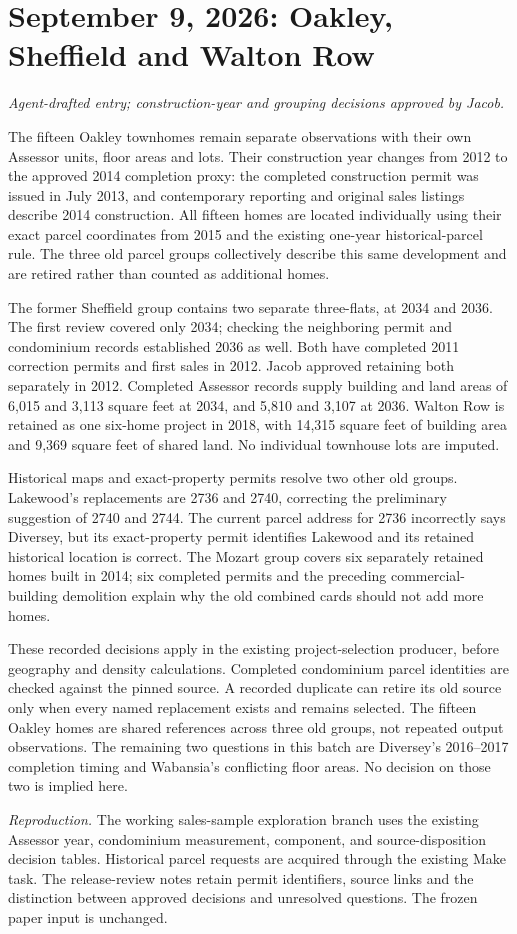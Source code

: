 \clearpage
\section*{September 9, 2026: Oakley, Sheffield and Walton Row}
\textit{Agent-drafted entry; construction-year and grouping decisions approved by Jacob.}

The fifteen Oakley townhomes remain separate observations with their own Assessor units, floor areas and lots. Their construction year changes from 2012 to the approved 2014 completion proxy: the completed construction permit was issued in July 2013, and contemporary reporting and original sales listings describe 2014 construction. All fifteen homes are located individually using their exact parcel coordinates from 2015 and the existing one-year historical-parcel rule. The three old parcel groups collectively describe this same development and are retired rather than counted as additional homes.

The former Sheffield group contains two separate three-flats, at 2034 and 2036. The first review covered only 2034; checking the neighboring permit and condominium records established 2036 as well. Both have completed 2011 correction permits and first sales in 2012. Jacob approved retaining both separately in 2012. Completed Assessor records supply building and land areas of 6,015 and 3,113 square feet at 2034, and 5,810 and 3,107 at 2036. Walton Row is retained as one six-home project in 2018, with 14,315 square feet of building area and 9,369 square feet of shared land. No individual townhouse lots are imputed.

Historical maps and exact-property permits resolve two other old groups. Lakewood's replacements are 2736 and 2740, correcting the preliminary suggestion of 2740 and 2744. The current parcel address for 2736 incorrectly says Diversey, but its exact-property permit identifies Lakewood and its retained historical location is correct. The Mozart group covers six separately retained homes built in 2014; six completed permits and the preceding commercial-building demolition explain why the old combined cards should not add more homes.

These recorded decisions apply in the existing project-selection producer, before geography and density calculations. Completed condominium parcel identities are checked against the pinned source. A recorded duplicate can retire its old source only when every named replacement exists and remains selected. The fifteen Oakley homes are shared references across three old groups, not repeated output observations. The remaining two questions in this batch are Diversey's 2016--2017 completion timing and Wabansia's conflicting floor areas. No decision on those two is implied here.

\medskip
\noindent\textit{Reproduction.} The working sales-sample exploration branch uses the existing Assessor year, condominium measurement, component, and source-disposition decision tables. Historical parcel requests are acquired through the existing Make task. The release-review notes retain permit identifiers, source links and the distinction between approved decisions and unresolved questions. The frozen paper input is unchanged.
